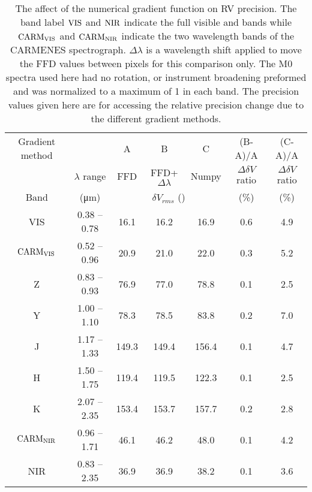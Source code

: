 
\begin{table}
    \centering
    \caption{The affect of the numerical gradient function on RV precision. The band label \(\rm VIS\) and \(\rm NIR\) indicate the full visible and \nir{} bands while  \(\rm CARM_{VIS}\)  and \(\rm CARM_{NIR}\)  indicate the two wavelength bands of the CARMENES spectrograph. \(\Delta\lambda\) is a wavelength shift applied to move the FFD values between pixels for this comparison only. The M0 spectra used here had no rotation, or instrument broadening preformed and  was normalized to a maximum of 1 in each band. The precision values given here are for accessing the relative precision change due to the different gradient methods.}
    \begin{tabular}{ccccccc}
        \toprule
        Gradient method &  &  A &   B & C & (B-A)/A & (C-A)/A \\
        &   $\lambda$ range & FFD & FFD+\(\Delta\lambda\) &  Numpy & \(\Delta\delta V\) ratio& \(\Delta\delta V\) ratio\\

        Band  &  (\si{\micro\meter}) &\multicolumn{3}{c}{\(\delta V_{rms}\) (\mps{})}  & (\%) & (\%) \\
        \midrule
        VIS & 0.38 -- 0.78 & 16.1 & 16.2 & 16.9  & 0.6 & 4.9\\
        \(\rm CARM_{VIS}\) & 0.52 --  0.96 & 20.9 & 21.0 & 22.0 & 0.3& 5.2 \\
        Z & 0.83 -- 0.93 & 76.9 & 77.0 & 78.8  & 0.1 & 2.5\\
        Y & 1.00 -- 1.10 & 78.3 & 78.5 & 83.8 & 0.2 & 7.0 \\
        J & 1.17 -- 1.33 & 149.3 & 149.4 & 156.4 & 0.1 & 4.7 \\
        H & 1.50 -- 1.75 & 119.4 & 119.5 & 122.3 & 0.1 & 2.5 \\
        K & 2.07 -- 2.35 & 153.4 & 153.7 & 157.7  & 0.2 & 2.8\\
        \(\rm CARM_{NIR}\) & 0.96 -- 1.71 & 46.1 & 46.2 & 48.0 & 0.1& 4.2 \\
        NIR & 0.83 -- 2.35 & 36.9 & 36.9 & 38.2 & 0.1 & 3.6  \\
        \bottomrule
    \end{tabular}\label{tab:numerical_gradients}
\end{table}
